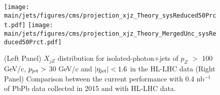 \begin{figure}[!ht]
\begin{center}
\texttt{[image: \\main/jets/figures/cms/projection\_xjz\_Theory\_sysReduced50Prct.pdf]}
\texttt{[image: \\main/jets/figures/cms/projection\_xjz\_Theory\_MergedUnc\_sysReduced50Prct.pdf]}
\caption{(Left Panel) $X_{jZ}$ distribution for isolated-photon+jets of $p_{Z}$ $> $ 100 GeV/c, $p_{\rm jet} > $ 30 GeV/c and $|\eta_{\rm jet}| < 1.6$ in the HL-LHC data (Right Panel) Comparison between the current performance with 0.4 nb$^{-1}$ of PbPb data collected in 2015 and with HL-LHC data. \cite{CMS-FTR-17-002:2017dec}}
\label{fig:Zjet}
\end{center}
\end{figure}
